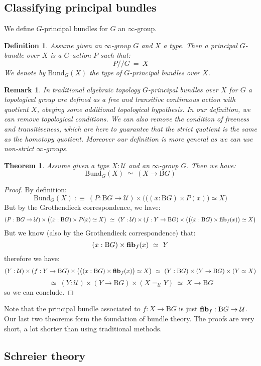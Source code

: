 \documentclass{article}
\newcommand{\sse}[1]{\medbreak \subsection{#1}}
\newcommand{\U}{{\mathcal U}}
\renewcommand{\r}{\rightarrow}
\newcommand{\fib}{\mathrm{\bf fib}}
\newcommand{\B}{\mathrm{B}}
\newtheorem{definition}{Definition}
\newtheorem{theorem}{Theorem}
\newtheorem{remark}{Remark}
\begin{document}
\sse{Classifying principal bundles}

We define $G$-principal bundles for $G$ an $\infty$-group.

\begin{definition}
Assume given an $\infty$-group $G$ and $X$ a type. Then a principal $G$-bundle over $X$ is a $G$-action $P$ such that:
\[P//G \ = \ X\]
We denote by $\mathrm{Bund}_G(X)$ the type of $G$-principal bundles over $X$.
\end{definition}

\begin{remark}
In traditional algebraic topology $G$-principal bundles over $X$ for $G$ a topological group are defined as a free and transitive continuous action with quotient $X$, obeying some additional topological hypothesis. In our definition, we can remove topological conditions. We can also remove the condition of freeness and transitiveness, which are here to guarantee that the strict quotient is the same as the homotopy quotient. Moreover our definition is more general as we can use non-strict $\infty$-groups.
\end{remark}

\begin{theorem}
Assume given a type $X:\U$ and an $\infty$-group $G$. Then we have:
\[\mathrm{Bund}_G(X)\ \simeq\ (X\r \B G)\]
\end{theorem}
\begin{proof}
By definition:
\[\mathrm{Bund}_G(X)\ :\equiv\ (P : \B G \r \U)\times \big( \big((x:\B G)\times P(x)\big) \simeq X \big)\]
But by the Grothendieck correspondence, we have:
 \[(P : \B G \r \U)\times \big((x:\B G)\times P(x) \simeq X \big) \ \simeq\ (Y:\U)\times (f:Y\r \B G) \times \big(\big((x:\B G)\times \fib_f(x)\big) \simeq X\big)\]
 But we know (also by the Grothendieck correspondence) that:  
 \[(x:\B G)\times \fib_f(x)\ \simeq\ Y\]
 therefore we have:
 \[(Y:\U)\times (f:Y\r \B G) \times \big(\big((x:\B G)\times \fib_f(x)\big) \simeq X\big) \ \simeq \ (Y:\B G)\times  (Y\r \B G)\times (Y \simeq X)\]
\[\ \simeq\ (Y:\U)\times (Y\r \B G)\times (X=_\U Y)\ \simeq \ X\r \B G\]
 so we can conclude.
\end{proof}

Note that the principal bundle associated to $f:X\r \B G$ is just $\fib_f : \B G \r \U$. Our last two theorems form the foundation of bundle theory. The proofs are very short, a lot shorter than using traditional methods. 


\sse{Schreier theory}
\end{document}
